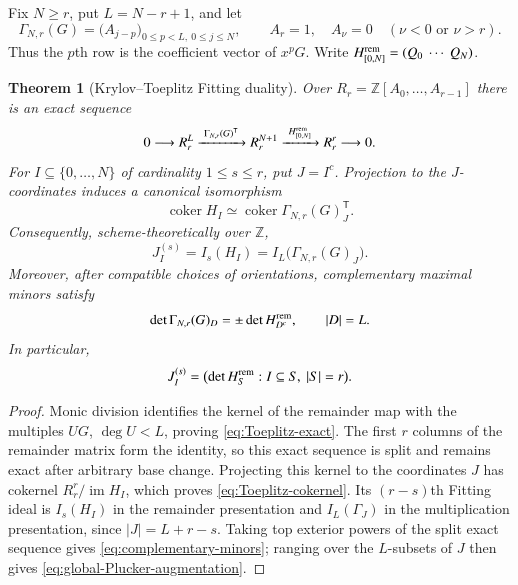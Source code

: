 \documentclass[10pt,fleqn]{article}
\numberwithin{equation}{section}
\newtheorem{theorem}{Theorem}[section]
\begin{document}
Fix $N\ge r$, put $L=N-r+1$, and let
\begin{equation}\label{eq:Toeplitz-matrix}
 \Gamma_{N,r}(G)=\bigl(A_{j-p}\bigr)_
 {0\le p<L,\ 0\le j\le N},
 \qquad A_r=1,\quad A_\nu=0\quad(\nu<0\text{ or }\nu>r).
\end{equation}
Thus the $p$th row is the coefficient vector of $x^pG$.  Write
$H^{\rm rem}_{[0,N]}=(Q_0\ \cdots\ Q_N)$.

\begin{theorem}[Krylov--Toeplitz Fitting duality]\label{thm:Toeplitz-duality}
Over $R_r=\mathbb Z[A_0,\ldots,A_{r-1}]$ there is an exact sequence
\begin{equation}\label{eq:Toeplitz-exact}
 0\longrightarrow R_r^L
 \xrightarrow{\ \Gamma_{N,r}(G)^{\mathsf T}\ }
 R_r^{N+1}
 \xrightarrow{\ H^{\rm rem}_{[0,N]}\ }
 R_r^r\longrightarrow0.
\end{equation}
For $I\subseteq\{0,\ldots,N\}$ of cardinality $1\le s\le r$,
put $J=I^c$. Projection to the $J$-coordinates induces a
canonical isomorphism
\begin{equation}\label{eq:Toeplitz-cokernel}
 \operatorname{coker}H_I\simeq
 \operatorname{coker}\Gamma_{N,r}(G)_J^{\mathsf T}.
\end{equation}
Consequently, scheme-theoretically over $\mathbb Z$,
\begin{equation}\label{eq:Toeplitz-Fitting}
 J_I^{(s)}=I_s(H_I)=I_L\bigl(\Gamma_{N,r}(G)_J\bigr).
\end{equation}
Moreover, after compatible choices of orientations, complementary maximal minors satisfy
\begin{equation}\label{eq:complementary-minors}
 \det\Gamma_{N,r}(G)_D=\pm\det H^{\rm rem}_{D^c},
 \qquad |D|=L.
\end{equation}
In particular,
\begin{equation}\label{eq:global-Plucker-augmentation}
 J_I^{(s)}=
 \bigl(\det H_S^{\rm rem}: I\subseteq S,\ |S|=r\bigr).
\end{equation}
\end{theorem}

\begin{proof}
Monic division identifies the kernel of the remainder map with the
multiples $UG$, $\deg U<L$, proving \eqref{eq:Toeplitz-exact}.
The first $r$ columns of the remainder matrix form the identity,
so this exact sequence is split and remains exact after arbitrary
base change.
Projecting this kernel to the coordinates $J$ has cokernel
$R_r^r/\operatorname{im}H_I$, which proves
\eqref{eq:Toeplitz-cokernel}.  Its $(r-s)$th Fitting ideal is
$I_s(H_I)$ in the remainder presentation and $I_L(\Gamma_J)$ in the
multiplication presentation, since $|J|=L+r-s$.
Taking top exterior powers of the split exact sequence gives
\eqref{eq:complementary-minors}; ranging over the $L$-subsets of $J$
then gives \eqref{eq:global-Plucker-augmentation}.
\end{proof}
\end{document}
